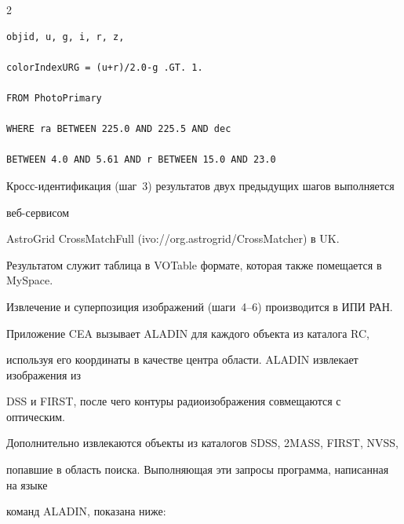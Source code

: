\begin{multicols}{2}
{\begin{verbatim}
objid, u, g, i, r, z, 

colorIndexURG = (u+r)/2.0-g .GT. 1. 

FROM PhotoPrimary 

WHERE ra BETWEEN 225.0 AND 225.5 AND dec 

BETWEEN 4.0 AND 5.61 AND r BETWEEN 15.0 AND 23.0 

\end{verbatim}

}









Кросс-идентификация (шаг~3) результатов двух предыдущих шагов выполняется 

веб-сер\-ви\-сом\linebreak

AstroGrid CrossMatchFull ({\sf ivo://org.astrogrid/\linebreak CrossMatcher}) в UK. 

Результатом служит таблица в VOTable формате, которая также помещается в MySpace. 



Извлечение и суперпозиция изображений (шаги~4--6) производится в ИПИ РАН. 

При\-ло\-же\-ние CEA вызывает ALADIN для каждого объекта из каталога RC, 

используя его координаты в качестве центра области. ALADIN извлекает изображения из 

DSS и FIRST, после чего контуры радиоизображения совмещаются с оптическим. 

Дополнительно извлекаются объекты из каталогов SDSS, 2MASS, FIRST, NVSS, 

попавшие в область поиска. Выполняющая эти запросы программа, написанная на языке 

команд ALADIN, показана ниже: 









\noindent

{\small

\begin{verbatim}


\end{verbatim}}
\end{multicols}
